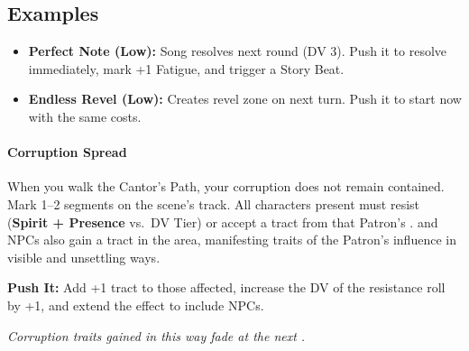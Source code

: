 \subsection*{Examples}
\begin{itemize}
\item \textbf{Perfect Note (Low):} Song resolves next round (DV 3). Push it to resolve immediately, mark +1 Fatigue, and trigger a Story Beat.
\item \textbf{Endless Revel (Low):} Creates revel zone on next turn. Push it to start now with the same costs.
\end{itemize}

\paragraph{Corruption Spread}
When you walk the Cantor’s Path, your corruption does not remain contained. 
Mark 1--2 segments on the scene’s  track. 
All characters present must resist (\textbf{Spirit + Presence} vs.~DV Tier) or accept a tract from that Patron’s . 
 and  NPCs also gain a tract in the area, manifesting traits of the Patron’s influence in visible and unsettling ways. 

\textbf{Push It:} Add +1 tract to those affected, increase the DV of the resistance roll by +1, and extend the effect to include  NPCs.

\textit{Corruption traits gained in this way fade at the next .}

